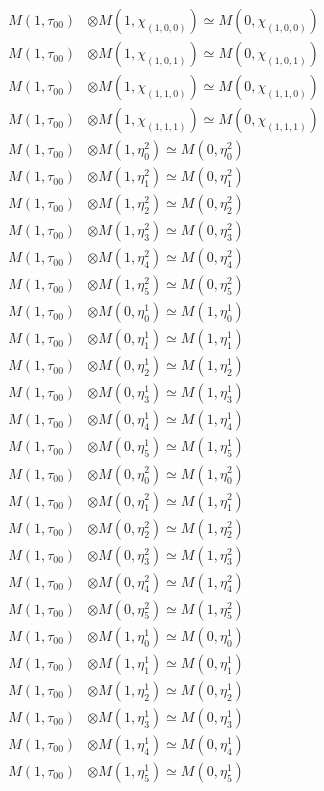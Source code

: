 \begin{align*}
M(1,\tau_{00}) &\otimes M(1,\chi_{(1,0,0)}) \simeq M(0,\chi_{(1,0,0)}) \\
M(1,\tau_{00}) &\otimes M(1,\chi_{(1,0,1)}) \simeq M(0,\chi_{(1,0,1)}) \\
M(1,\tau_{00}) &\otimes M(1,\chi_{(1,1,0)}) \simeq M(0,\chi_{(1,1,0)}) \\
M(1,\tau_{00}) &\otimes M(1,\chi_{(1,1,1)}) \simeq M(0,\chi_{(1,1,1)}) \\
M(1,\tau_{00}) &\otimes M(1,\eta^{2}_{0}) \simeq M(0,\eta^{2}_{0}) \\
M(1,\tau_{00}) &\otimes M(1,\eta^{2}_{1}) \simeq M(0,\eta^{2}_{1}) \\
M(1,\tau_{00}) &\otimes M(1,\eta^{2}_{2}) \simeq M(0,\eta^{2}_{2}) \\
M(1,\tau_{00}) &\otimes M(1,\eta^{2}_{3}) \simeq M(0,\eta^{2}_{3}) \\
M(1,\tau_{00}) &\otimes M(1,\eta^{2}_{4}) \simeq M(0,\eta^{2}_{4}) \\
M(1,\tau_{00}) &\otimes M(1,\eta^{2}_{5}) \simeq M(0,\eta^{2}_{5}) \\
M(1,\tau_{00}) &\otimes M(0,\eta^{1}_{0}) \simeq M(1,\eta^{1}_{0}) \\
M(1,\tau_{00}) &\otimes M(0,\eta^{1}_{1}) \simeq M(1,\eta^{1}_{1}) \\
M(1,\tau_{00}) &\otimes M(0,\eta^{1}_{2}) \simeq M(1,\eta^{1}_{2}) \\
M(1,\tau_{00}) &\otimes M(0,\eta^{1}_{3}) \simeq M(1,\eta^{1}_{3}) \\
M(1,\tau_{00}) &\otimes M(0,\eta^{1}_{4}) \simeq M(1,\eta^{1}_{4}) \\
M(1,\tau_{00}) &\otimes M(0,\eta^{1}_{5}) \simeq M(1,\eta^{1}_{5}) \\
M(1,\tau_{00}) &\otimes M(0,\eta^{2}_{0}) \simeq M(1,\eta^{2}_{0}) \\
M(1,\tau_{00}) &\otimes M(0,\eta^{2}_{1}) \simeq M(1,\eta^{2}_{1}) \\
M(1,\tau_{00}) &\otimes M(0,\eta^{2}_{2}) \simeq M(1,\eta^{2}_{2}) \\
M(1,\tau_{00}) &\otimes M(0,\eta^{2}_{3}) \simeq M(1,\eta^{2}_{3}) \\
M(1,\tau_{00}) &\otimes M(0,\eta^{2}_{4}) \simeq M(1,\eta^{2}_{4}) \\
M(1,\tau_{00}) &\otimes M(0,\eta^{2}_{5}) \simeq M(1,\eta^{2}_{5}) \\
M(1,\tau_{00}) &\otimes M(1,\eta^{1}_{0}) \simeq M(0,\eta^{1}_{0}) \\
M(1,\tau_{00}) &\otimes M(1,\eta^{1}_{1}) \simeq M(0,\eta^{1}_{1}) \\
M(1,\tau_{00}) &\otimes M(1,\eta^{1}_{2}) \simeq M(0,\eta^{1}_{2}) \\
M(1,\tau_{00}) &\otimes M(1,\eta^{1}_{3}) \simeq M(0,\eta^{1}_{3}) \\
M(1,\tau_{00}) &\otimes M(1,\eta^{1}_{4}) \simeq M(0,\eta^{1}_{4}) \\
M(1,\tau_{00}) &\otimes M(1,\eta^{1}_{5}) \simeq M(0,\eta^{1}_{5}) \\
\end{align*}

